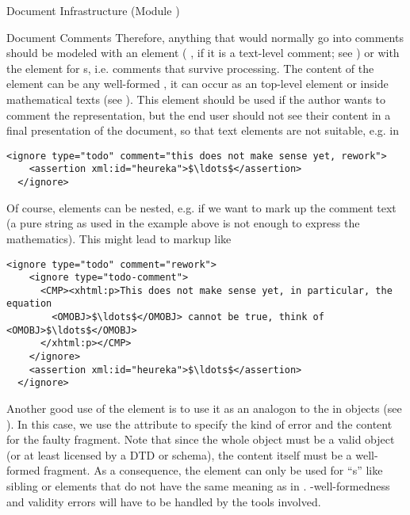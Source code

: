 \begin{tchapter}[id=omdoc-infrastructure,short=Document Infrastructure]{Document Infrastructure (Module )}
{\begin{tsection}[id=comments]{Document Comments}
  Therefore, anything that would normally go into comments should be modeled with an
   element ( ,
  if it is a text-level comment; see ) or with the 
  element for {s}, i.e.  comments that survive processing.
  The content of the  element can be any well-formed \omdoc, it can
  occur as an \omdoc top-level element or inside mathematical texts (see
  ). This element should be used if the author wants to comment the
  \omdoc representation, but the end user should not see their content in a final
  presentation of the document, so that \omdoc text elements are not suitable, e.g. in

\begin{lstlisting}[numbers=none,index={ignore},mathescape]
  <ignore type="todo" comment="this does not make sense yet, rework">
    <assertion xml:id="heureka">$\ldots$</assertion>
  </ignore>
\end{lstlisting}

Of course,  elements can be nested, e.g. if we want to mark up
the comment text (a pure string as used in the example above is not enough to
express the mathematics). This might lead to markup like 

\begin{lstlisting}[label=nested-ignore,numbers=none,index={ignore},mathescape]
  <ignore type="todo" comment="rework">
    <ignore type="todo-comment">
      <CMP><xhtml:p>This does not make sense yet, in particular, the equation 
        <OMOBJ>$\ldots$</OMOBJ> cannot be true, think of <OMOBJ>$\ldots$</OMOBJ>
      </xhtml:p></CMP>
    </ignore>
    <assertion xml:id="heureka">$\ldots$</assertion>
  </ignore>
\end{lstlisting}

Another good use of the  element is to use it as an analogon to the
 in {\openmath} objects (see
). In this case, we use the  attribute to
specify the kind of error and the content for the faulty \omdoc fragment. Note that
since the whole object must be a valid \omdoc object (or at least licensed by a DTD or
schema), the content itself must be a well-formed \omdoc fragment. As a consequence, the
 element can only be used for ``{s}'' like
sibling  or  elements that do not have the same meaning as
in . {\xml}-well-formedness and validity errors will have to be
handled by the {\xml} tools involved.


\end{tsection}}
\end{tchapter}
